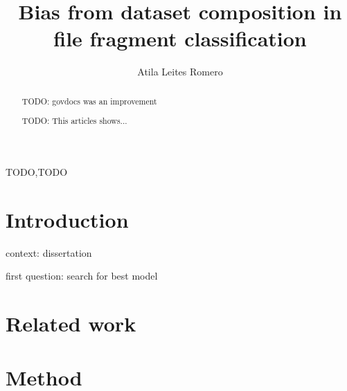 \documentclass[review]{elsarticle}
\begin{document}
\begin{frontmatter}

\title{Bias from dataset composition in file fragment classification}

\author[mymainaddress,mysecondaryaddress]{Atila Leites Romero}

\address[mymainaddress]{PUC}
\address[mysecondaryaddress]{Brazilian Federal Police, Av Ipiranga 1365, Porto Alegre/RS, Brazil}






\begin{abstract}
TODO: govdocs was an improvement

TODO: This articles shows...
\end{abstract}

\begin{keyword}
TODO\sep TODO
\end{keyword}

\end{frontmatter}

\linenumbers

\section{Introduction}

context: dissertation

first question: search for best model

\section{Related work}


\section{Method}

\end{document}

